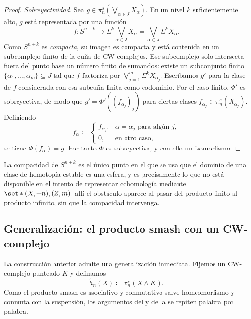 \begin{proof}
\emph{Sobreyectividad.} Sea $g\in\pi_n^s(\bigvee_{\alpha\in J}X_\alpha)$. En un nivel $k$ suficientemente alto, $g$ está representada por una función
\[
f\colon S^{n+k}\longrightarrow\Sigma^k\bigvee_{\alpha\in J}X_\alpha=\bigvee_{\alpha\in J}\Sigma^kX_\alpha .
\]
Como $S^{n+k}$ es \emph{compacta}, su imagen es compacta y está contenida en un subcomplejo finito de la cuña de CW-complejos. Ese subcomplejo solo intersecta fuera del punto base un número finito de sumandos: existe un subconjunto finito $\{\alpha_1,\dots,\alpha_m\}\subseteq J$ tal que $f$ factoriza por $\bigvee_{j=1}^m\Sigma^kX_{\alpha_j}$. Escribamos $g'$ para la clase de $f$ considerada con esa subcuña finita como codominio. Por el caso finito, $\Phi'$ es sobreyectiva, de modo que $g'=\Phi'((f_{\alpha_j})_j)$ para ciertas clases $f_{\alpha_j}\in\pi_n^s(X_{\alpha_j})$. Definiendo
\[
f_\alpha\coloneqq
\begin{cases}
f_{\alpha_j}, & \alpha=\alpha_j \text{ para algún } j,\\
0, & \text{en otro caso},
\end{cases}
\]
se tiene $\Phi(f_\alpha)=g$. Por tanto $\Phi$ es sobreyectiva, y con ello un isomorfismo.
\end{proof}

\begin{nota}
   La compacidad de $S^{n+k}$ es el único punto en el que se usa que el dominio de una clase de homotopía estable es una esfera, y es precisamente lo que no está disponible en el intento de representar cohomología mediante $\set*{(X,-n),(Z,m)}$: allí el obstáculo aparece al pasar del producto finito al producto infinito, sin que la compacidad intervenga.
\end{nota}

\subsection{Generalización: el producto smash con un CW-complejo}

La construcción anterior admite una generalización inmediata. Fijemos un CW-complejo punteado $K$ y definamos
\[
\tilde h_n(X)\coloneqq\pi_n^s(X\wedge K).
\]
Como el producto smash es asociativo y conmutativo salvo homeomorfismo y conmuta con la suspensión, los argumentos del  y de la  se repiten palabra por palabra.

